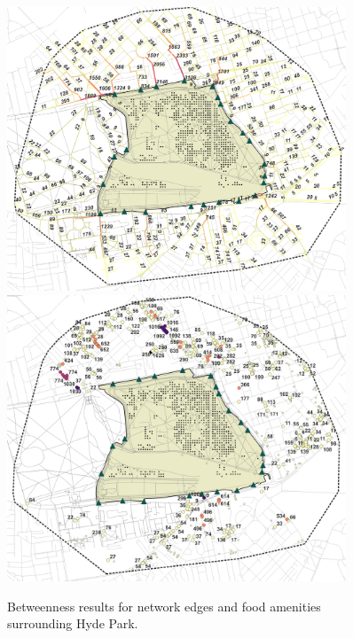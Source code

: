 \begin{figure}[H]
  \centering
  \captionsetup{width=0.9\textwidth}
  \includegraphics[width=0.9\textwidth]{images/network/hyde_betweenness_roads.png} \\
  \vspace{10pt} %
  \includegraphics[width=0.9\textwidth]{images/network/hyde_betweenness_food.png} \\
  \vspace{10pt}
  \caption[Hyde Park - betweenness]{Betweenness results for network edges and food amenities surrounding Hyde Park.}
  \label{fig:hyde_betweenness}
\end{figure}

